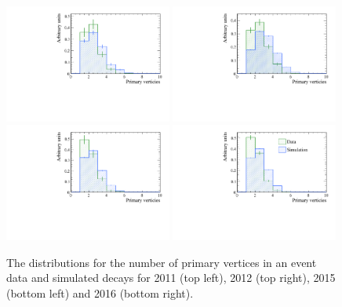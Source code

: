 \begin{figure}[tbp]
  \centering
    \includegraphics[width=0.49\textwidth]{./Figs/LifetimeSystematics/2011_nPVs.pdf}
    \includegraphics[width=0.49\textwidth]{./Figs/LifetimeSystematics/2012_nPVs.pdf}
    \includegraphics[width=0.49\textwidth]{./Figs/LifetimeSystematics/2015_nPVs.pdf}
    \includegraphics[width=0.49\textwidth]{./Figs/LifetimeSystematics/2016_nPVs.pdf}
  \caption{The distributions for the number of primary vertices in an event \bdkpi data and simulated decays for 2011 (top left), 2012 (top right), 2015 (bottom left) and 2016 (bottom right).}
  \label{fig:Bd2KPi_nPVs_MC_data_comparison}
\end{figure}


